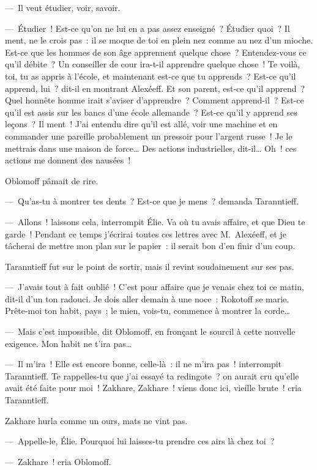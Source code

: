 \documentclass[french,twoside]{book} %
\begin{document}
— Il veut étudier, voir, savoir.\par
— Étudier ! Est-ce qu’on ne lui en a pas assez enseigné ? Étudier quoi ? Il ment, ne le crois pas : il se moque de toi en plein nez comme au nez d’un mioche. Est-ce que les hommes de son âge apprennent quelque chose ? Entendez-vous ce qu’il débite ? Un conseiller de cour ira-t-il apprendre quelque chose ! Te voilà, toi, tu as appris à l’école, et maintenant est-ce que tu apprends ? Est-ce qu’il apprend, lui ? dit-il en montrant Alexéeff. Et son parent, est-ce qu’il apprend ? Quel honnête homme irait s’aviser d’apprendre ? Comment apprend-il ? Est-ce qu’il est assis sur les bancs d’une école allemande ? Est-ce qu’il y apprend ses leçons ? Il ment ! J’ai entendu dire qu’il est allé, voir une machine et en commander une pareille probablement un pressoir pour l’argent russe ! Je le mettrais dans une maison de force… Des actions industrielles, dit-il… Oh ! ces actions me donnent des nausées !\par
Oblomoff pâmait de rire.\par
— Qu’as-tu à montrer tes dents ? Est-ce que je mens ? demanda Taranntieff.\par
— Allons ! laissons cela, interrompit Élie. Va où tu avais affaire, et que Dieu te garde ! Pendant ce temps j’écrirai toutes ces lettres avec M. Alexéeff, et je tâcherai de mettre mon plan sur le papier : il serait bon d’en finir d’un coup.\par
Taranntieff fut sur le point de sortir, mais il revint soudainement sur ses pas.\par
— J’avais tout à fait oublié ! C’est pour affaire que je venais chez toi ce matin, dit-il d’un ton radouci. Je dois aller demain à une noce : Rokotoff se marie. Prête-moi ton habit, pays ; le mien, vois-tu, commence à montrer la corde…\par
— Mais c’est impossible, dit Oblomoff, en fronçant le sourcil à cette nouvelle exigence. Mon habit ne t’ira pas…\par
— Il m’ira ! Elle est encore bonne, celle-là : il ne m’ira pas ! interrompit Taranntieff. Te rappelles-tu que j’ai essayé ta redingote ? on aurait cru qu’elle avait été faite pour moi ! Zakhare, Zakhare ! viens donc ici, vieille brute ! cria Taranntieff.\par
Zakhare hurla comme un ours, mats ne vint pas.\par
— Appelle-le, Élie. Pourquoi lui laisses-tu prendre ces airs là chez toi ?\par
— Zakhare ! cria Oblomoff.\par
\end{document}
